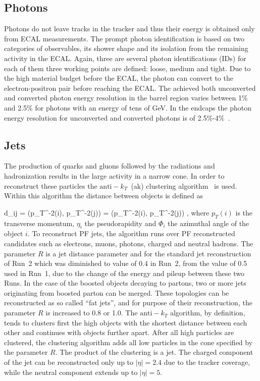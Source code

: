 \subsection{Photons}

Photons do not leave tracks in the tracker and thus their energy is obtained only from ECAL measurements. The prompt photon identification is based on two categories of observables, its shower shape and its isolation from the remaining activity in the ECAL. Again, three are several photon identifications (IDs) for each of them three working points are defined: loose, medium and tight. Due to the high material budget before the ECAL, the photon can convert to the electron-positron pair before reaching the ECAL. The achieved both unconverted and converted photon energy resolution in the barrel region varies between 1\% and 2.5\% for photons with an energy of tens of GeV. In the endcaps the photon energy resolution for unconverted and converted photons is of 2.5\%-4\%~\cite{CMS:EGM-14-001}.

\subsection{Jets}

The production of quarks and gluons followed by the radiations and hadronization results in the large activity in a narrow cone. In order to reconstruct these particles the $\mathrm{anti-}k_{T}$~(ak) clustering algorithm~\cite{Cacciari:2008gp, Cacciari:2011ma} is used. Within this algorithm the distance between objects is defined as

{   
    d_{ij} = \left({p_{T}}^{-2}(i), {p_{T}}^{-2}(j)\right)  =  ({p_{T}}^{-2}(i), {p_{T}}^{-2}(j)) ,
}
where $p_{T}(i)$ is the transverse momentum, $\eta_{i}$  the pseudorapidity and $\Phi_{i}$ the azimuthal angle of the object $i$. To reconstruct PF jets, the algorithm runs over PF reconstructed candidates such as electrons, muons, photons, charged and neutral hadrons. The parameter $R$ is a jet distance parameter and for the standard jet reconstruction of Run~2 which was diminished to value of 0.4 in Run~2, from the value of 0.5 used in Run~1, due to the change of the energy and pileup between these two Runs. In the case of the boosted objects decaying to partons, two or more jets originating from boosted parton can be merged. These topologies can be reconstructed as so called ``fat jets'', and for purpose of their reconstruction, the parameter $R$ is increased to 0.8 or 1.0. The $\mathrm{anti-}k_{T}$ algorithm, by definition, tends to clusters first the high \pt objects with the shortest distance between each other and continues with objects further apart. After all high \pt particles are clustered, the clustering algorithm adds all low \pt particles in the cone specified by the parameter $R$. The product of the clustering is a jet. The charged component of the jet can be reconstructed only up to $|\eta|=2.4$ due to the tracker coverage, while the neutral component extends up to  $|\eta|=5$.

